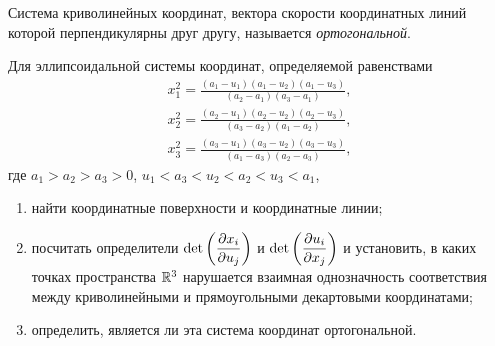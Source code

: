 \begin{definition}
	Система криволинейных координат, вектора скорости координатных линий которой перпендикулярны друг другу, называется \textit{ортогональной}.
\end{definition}

\begin{problem}
	Для эллипсоидальной системы координат, определяемой равенствами
	\begin{gather*}
		x_1^2 = \frac{(a_1 - u_1)(a_1 - u_2)(a_1 - u_3)}{(a_2 - a_1)(a_3 - a_1)},\\
		x_2^2 = \frac{(a_2 - u_1)(a_2 - u_2)(a_2 - u_3)}{(a_3 - a_2)(a_1 - a_2)},\\
		x_3^2 = \frac{(a_3 - u_1)(a_3 - u_2)(a_3 - u_3)}{(a_1 - a_3)(a_2 - a_3)},
	\end{gather*}
	где $a_1 > a_2 > a_3 > 0$, $u_1 < a_3 < u_2 < a_2 < u_3 < a_1$,
	\begin{enumerate}[nolistsep, label=(\arabic*)]
		\item найти координатные поверхности и координатные линии;
		\item посчитать определители $\displaystyle\det\left(\frac{\partial x_i}{\partial u_j}\right)$ и $\displaystyle\det\left(\frac{\partial u_i}{\partial x_j}\right)$ и установить, в каких точках пространства $\mathbb{R}^3$ нарушается взаимная однозначность соответствия между криволинейными и прямоугольными декартовыми координатами;
		\item определить, является ли эта система координат ортогональной.
	\end{enumerate}
\end{problem}

\pagebreak

